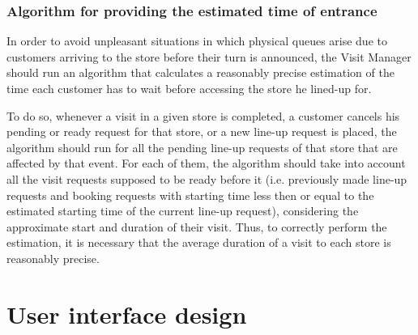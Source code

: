 \documentclass[a4paper,oneside,11pt]{book}
\begin{document}
    \subsection{Algorithm for providing the estimated time of entrance}
    In order to avoid unpleasant situations in which physical queues arise due to customers arriving to the store before their turn is announced, the Visit Manager should run an algorithm that calculates a reasonably precise estimation of the time each customer has to wait before accessing the store he lined-up for. \par
    To do so, whenever a visit in a given store is completed,  a customer cancels his pending or ready request for that store, or a new line-up request is placed, the algorithm should run for all the pending line-up requests of that store that are affected by that event. For each of them, the algorithm should take into account all the visit requests supposed to be ready before it (i.e. previously made line-up requests and booking requests with starting time less then or equal to the estimated starting time of the current line-up request), considering the approximate start and duration of their visit. Thus, to correctly perform the estimation, it is necessary that the average duration of a visit to each store is reasonably precise. 
    
\chapter{User interface design}
\end{document}
